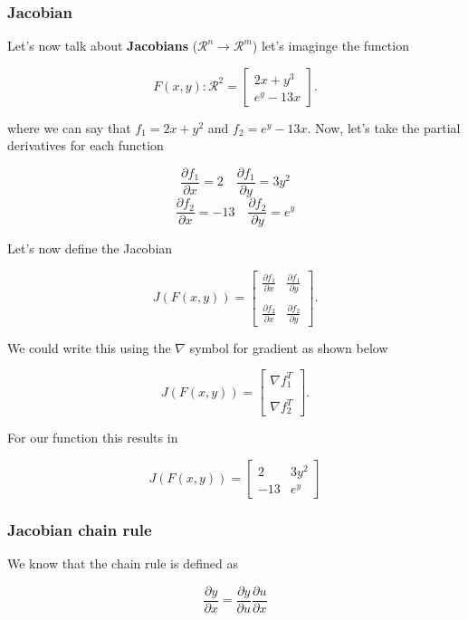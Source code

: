 \documentclass[a4paper,10pt]{article}
\begin{document}
\subsubsection{Jacobian}

Let's now talk about \textbf{Jacobians} ($\mathcal{R}^n \rightarrow \mathcal{R}^m$) let's imaginge the function 

$$
F(x, y) : \mathcal{R}^2 = \begin{bmatrix}
2x + y^3 \\
e^y - 13x
\end{bmatrix}.
$$

\noindent where we can say that $f_1 = 2x + y^2$ and $f_2 = e^y - 13x$. Now, let's take the partial derivatives for each function

$$ \frac{\partial f_1}{\partial x} = 2 \quad \frac{\partial f_1}{\partial y} = 3y^2 $$
$$ \frac{\partial f_2}{\partial x} = -13 \quad \frac{\partial f_2}{\partial y} = e^y $$

Let's now define the Jacobian 

$$
J(F(x, y)) = \begin{bmatrix}
\frac{\partial f_1}{\partial x} & \frac{\partial f_1}{\partial y} \\
&\\
\frac{\partial f_2}{\partial x} & \frac{\partial f_2}{\partial y}
\end{bmatrix}.
$$

We could write this using the $\nabla$ symbol for gradient as shown below

$$
J(F(x, y)) = \begin{bmatrix}
\nabla f_1^T \\
\\
\nabla f_2^T
\end{bmatrix}.
$$

For our function this results in 

$$
J(F(x, y)) = \begin{bmatrix}
2 & 3y^2 \\
-13 & e^y
\end{bmatrix}
$$

\subsubsection{Jacobian chain rule}

We know that the chain rule is defined as 

$$ \frac{\partial y}{\partial x} = \frac{\partial y}{\partial u} \frac{\partial u}{\partial x}$$
\end{document}
